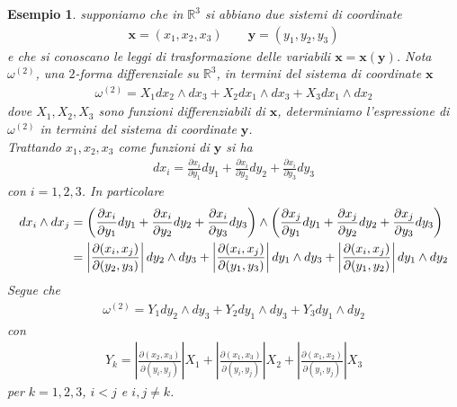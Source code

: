 \documentclass[oneside, 11pt]{amsbook}
\newcommand{\0}{{(0)}}
\newcommand{\3}{{(3)}}
\theoremstyle{colonplain}
\theoremstyle{colondefinition}
\newtheorem{ex}[thm]{Esempio}
\theoremstyle{colonremark}
\numberwithin{equation}{chapter}
\begin{document}
\begin{ex} supponiamo che in $\mathbb{R}^3$ si abbiano due sistemi di coordinate
\begin{align}
   \mathbf{x} = (x_1, x_2, x_3) \qquad \mathbf{y} = (y_1, y_2, y_3) 
\end{align}
e che si conoscano le leggi di trasformazione delle variabili $\mathbf{x} = \mathbf{x}(\mathbf{y})$. Nota $\omega^{(2)}$, una $2$-forma differenziale su $\mathbb{R}^3$, in termini del sistema di coordinate $\mathbf{x}$
\begin{align}
   \omega^{(2)} = X_1dx_2 \wedge dx_3 + X_2dx_1 \wedge dx_3 + X_3dx_1 \wedge dx_2 
\end{align}
dove $X_1, X_2, X_3$ sono funzioni differenziabili di $\mathbf{x}$, determiniamo l'espressione di $\omega^{(2)}$ in termini del sistema di coordinate $\mathbf{y}$. \\
Trattando $x_1, x_2, x_3$ come funzioni di $\mathbf{y}$ si ha
\begin{align}
   dx_i = \frac{\partial x_i}{\partial y_1}dy_1 + \frac{\partial x_i}{\partial y_2}dy_2 + \frac{\partial x_i}{\partial y_3}dy_3 
\end{align}
con $i = 1, 2, 3$. In particolare
\begin{align}
   dx_i \wedge dx_j &= \left(\frac{\partial x_i}{\partial y_1}dy_1 + \frac{\partial x_i}{\partial y_2}dy_2 + \frac{\partial x_i}{\partial y_3}dy_3\right) \wedge \left(\frac{\partial x_j}{\partial y_1}dy_1 + \frac{\partial x_j}{\partial y_2}dy_2 + \frac{\partial x_j}{\partial y_3}dy_3\right) \notag \\
   &= \left|\frac{\partial(x_i, x_j)}{\partial(y_2, y_3)}\right|dy_2 \wedge dy_3 + \left|\frac{\partial(x_i, x_j)}{\partial(y_1, y_3)}\right|dy_1 \wedge dy_3 + \left|\frac{\partial(x_i, x_j)}{\partial(y_1, y_2)}\right|dy_1 \wedge dy_2 
\end{align}
Segue che 
\begin{align}
   \omega^{(2)} = Y_1dy_2 \wedge dy_3 + Y_2dy_1 \wedge dy_3 + Y_3dy_1 \wedge dy_2 
\end{align}
con
\begin{align}
   Y_k = \left|\frac{\partial(x_2, x_3)}{\partial(y_i, y_j)}\right|X_1 + \left|\frac{\partial(x_1, x_3)}{\partial(y_i, y_j)}\right|X_2 + \left|\frac{\partial(x_1, x_2)}{\partial(y_i, y_j)}\right|X_3 
\end{align}
per $k = 1, 2, 3$, $i < j$ e $i, j \neq k$.
\end{ex}
\end{document}
